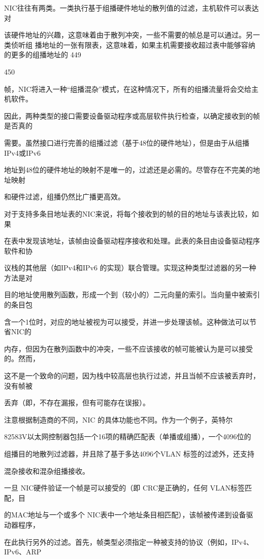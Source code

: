 NIC往往有两类。一类执行基于组播硬件地址的散列值的过滤，主机软件可以表达对

该硬件地址的兴趣，这意味着由于散列冲突，一些不需要的帧总是可以通过。另一类侦听组
播地址的一张有限表，这意味着，如果主机需要接收超过表中能够容纳的更多的组播地址的
449

450

帧，NIC将进入一种“组播混杂”模式，在这种情况下，所有的组播流量将会交给主机软件。

因此，两种类型的接口需要设备驱动程序或高层软件执行检查，以确定接收到的帧是否真的

需要。虽然接口进行完善的组播过滤（基于48位的硬件地址），但是由于从组播IPv4或IPv6

地址到48位的硬件地址的映射不是唯一的，过滤还是必需的。尽管存在不完美的地址映射

和硬件过滤，组播仍然比广播更高效。

对于支持多条目地址表的NIC来说，将每个接收到的帧的目的地址与该表比较，如果

在表中发现该地址，该帧由设备驱动程序接收和处理。此表的条目由设备驱动程序软件和协

议栈的其他层（如IPv4和IPv6 的实现）联合管理。实现这种类型过滤器的另一种方法是对

目的地址使用散列函数，形成一个到（较小的）二元向量的索引。当向量中被索引的条目包

含一个1位时，对应的地址被视为可以接受，并进一步处理该帧。这种做法可以节省NIC的

内存，但因为在散列函数中的冲突，一些不应该接收的帧可能被认为是可以接受的。然而，

这不是一个致命的问题，因为栈中较高层也执行过滤，并且当帧不应该被丢弃时，没有帧被

丢弃（即，不存在漏报，但有可能存在误报）。

注意根据制造商的不同，NIC 的具体功能也不同。作为一个例子，英特尔

82583V以太网控制器包括一个16项的精确匹配表（单播或组播），一个4096位的

组播目的地散列过滤器，并且除了基于多达4096个VLAN 标签的过滤外，还支持

混杂接收和混杂组播接收。

一旦 NIC硬件验证一个帧是可以接受的（即 CRC是正确的，任何 VLAN标签匹配，目

的MAC地址与一个或多个 NIC表中一个地址条目相匹配），该帧被传递到设备驱动器程序，

在此执行另外的过滤。首先，帧类型必须指定一种被支持的协议（例如，IPv4、IPv6、ARP

